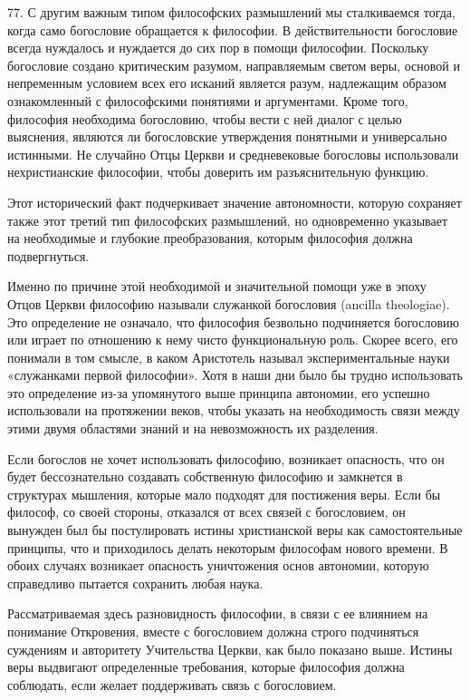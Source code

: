 \documentclass[a5paper,10pt]{article}
\begin{document}
77. С другим важным типом философских размышлений мы сталкиваемся тогда, когда
само богословие обращается к философии. В действительности богословие всегда
нуждалось и нуждается до сих пор в помощи философии. Поскольку богословие
создано критическим разумом, направляемым светом веры, основой и непременным
условием всех его исканий является разум, надлежащим образом ознакомленный с
философскими понятиями и аргументами. Кроме того, философия необходима
богословию, чтобы вести с ней диалог с целью выяснения, являются ли
богословские утверждения понятными и универсально истинными. Не случайно Отцы
Церкви и средневековые богословы использовали нехристианские философии, чтобы
доверить им разъяснительную функцию.

Этот исторический факт подчеркивает значение автономности, которую сохраняет
также этот третий тип философских размышлений, но одновременно указывает на
необходимые и глубокие преобразования, которым философия должна подвергнуться.

Именно по причине этой необходимой и значительной помощи уже в эпоху Отцов
Церкви философию называли служанкой богословия (ancilla theologiae). Это
определение не означало, что философия безвольно подчиняется богословию или
играет по отношению к нему чисто функциональную роль. Скорее всего, его
понимали в том смысле, в каком Аристотель называл экспериментальные науки
«служанками первой философии». Хотя в наши дни было бы трудно использовать это
определение из-за упомянутого выше принципа автономии, его успешно использовали
на протяжении веков, чтобы указать на необходимость связи между этими двумя
областями знаний и на невозможность их разделения.

Если богослов не хочет использовать философию, возникает опасность, что он
будет бессознательно создавать собственную философию и замкнется в структурах
мышления, которые мало подходят для постижения веры. Если бы философ, со своей
стороны, отказался от всех связей с богословием, он вынужден был бы
постулировать истины христианской веры как самостоятельные принципы, что и
приходилось делать некоторым философам нового времени. В обоих случаях
возникает опасность уничтожения основ автономии, которую справедливо пытается
сохранить любая наука.

Рассматриваемая здесь разновидность философии, в связи с ее влиянием на
понимание Откровения, вместе с богословием должна строго подчиняться суждениям
и авторитету Учительства Церкви, как было показано выше. Истины веры выдвигают
определенные требования, которые философия должна соблюдать, если желает
поддерживать связь с богословием.
\end{document}
